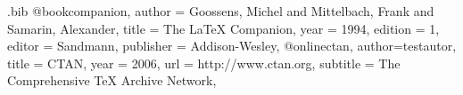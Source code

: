 \begin{filecontents}{\jobname.bib}
@book{companion,
  author       = {Goossens, Michel and Mittelbach, Frank and Samarin, Alexander},
  title        = {The LaTeX Companion},
  year         = 1994,
  edition      = 1,
  editor = {Sandmann},
  publisher    = {Addison-Wesley},
}
@online{ctan,
	author={testautor},
  title        = {CTAN},
  year         = 2006,
  url          = {http://www.ctan.org},
  subtitle     = {The Comprehensive TeX Archive Network},
}

\end{filecontents}


\documentclass{article}
\usepackage[utf8]{inputenc}
\usepackage[ngerman]{babel}
\usepackage[T1]{fontenc}
\usepackage{url}
\usepackage{xpatch}
\tracingpatches
{}
\usepackage[numbers]{natbib}

\let\citeP\citep
\bibpunct{(}{)}{;}{}{}{,}
\makeatletter
\newcommand{\citefont}{\scshape}
\renewcommand*\NAT@nmfmt[1]{{\citefont\NAT@up#1}}
\makeatother

\citep{companion}\par
\citep{ctan}



